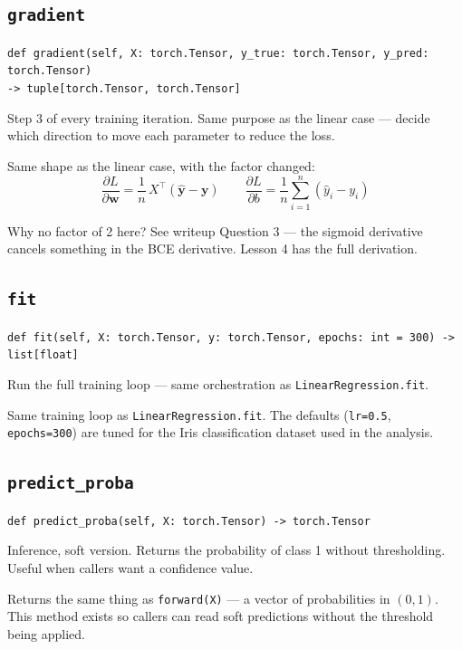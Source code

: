 \documentclass[11pt]{article}
\newcommand{\code}[1]{\texttt{\small #1}}
\newcommand{\vw}{\mathbf{w}}
\newcommand{\vy}{\mathbf{y}}
\newcommand{\vyhat}{\hat{\mathbf{y}}}
\begin{document}
\subsection{\texttt{gradient}}

\noindent
\code{def gradient(self, X: torch.Tensor, y\_true: torch.Tensor, y\_pred: torch.Tensor)\\
\hspace*{2em}-> tuple[torch.Tensor, torch.Tensor]}

\medskip\noindent
Step 3 of every training iteration. Same purpose as the linear
case --- decide which direction to move each parameter to reduce the loss.

\medskip\noindent
Same shape as the linear case, with the factor changed:
\[
    \frac{\partial L}{\partial \vw} = \frac{1}{n}\, X^{\top} (\vyhat - \vy)
    \qquad
    \frac{\partial L}{\partial b} = \frac{1}{n} \sum_{i=1}^{n} (\hat{y}_i - y_i)
\]

\noindent
Why no factor of 2 here? See writeup Question 3 --- the sigmoid derivative
cancels something in the BCE derivative. Lesson 4 has the full derivation.

\subsection{\texttt{fit}}

\noindent
\code{def fit(self, X: torch.Tensor, y: torch.Tensor, epochs: int = 300) -> list[float]}

\medskip\noindent
Run the full training loop --- same orchestration as
\code{LinearRegression.fit}.

\medskip\noindent
Same training loop as \code{LinearRegression.fit}. The defaults
(\code{lr=0.5}, \code{epochs=300}) are tuned for the Iris classification dataset
used in the analysis.

\subsection{\texttt{predict\_proba}}

\noindent
\code{def predict\_proba(self, X: torch.Tensor) -> torch.Tensor}

\medskip\noindent
Inference, soft version. Returns the probability of class 1
without thresholding. Useful when callers want a confidence value.

\medskip\noindent
Returns the same thing as \code{forward(X)} --- a vector of probabilities in
$(0, 1)$. This method exists so callers can read soft predictions without the
threshold being applied.
\end{document}

